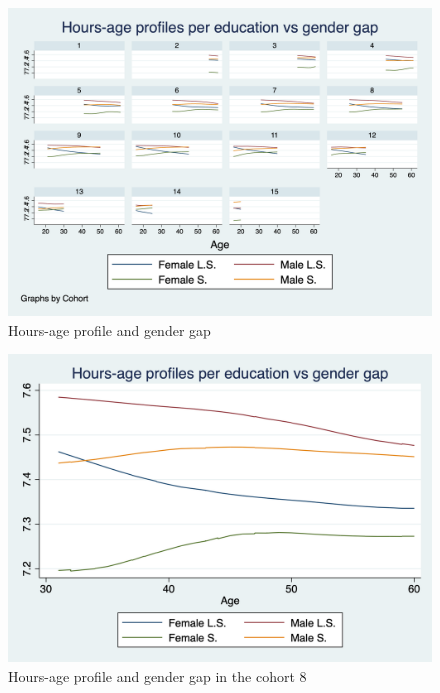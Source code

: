 \documentclass[12pt]{article}
\begin{document}
\begin{center}
\begin{figure}[!h]
    \includegraphics[scale=0.35]{graph5.png}
    \caption{\label{fig:h_l_cohorts}Hours-age profile and gender gap}
\end{figure}
\begin{figure}[!h]
    \includegraphics[scale=0.35]{graph5_1.png}
    \caption{\label{fig:h_l_coh8}Hours-age profile and gender gap in the cohort 8}
\end{figure}
\end{center}




 
\end{document}
